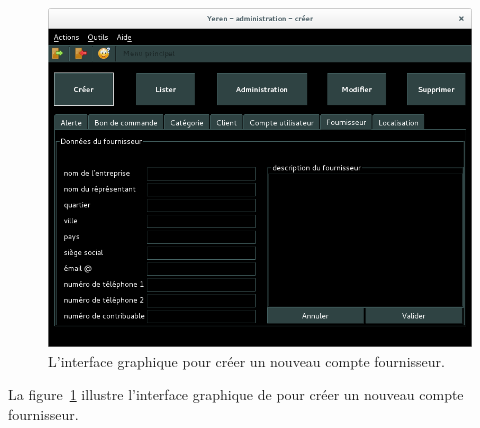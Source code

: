 
\newpage
{}

\begin{figure}[!htpb]
	\centering
	\includegraphics[scale=0.45]{images/compte-fournisseur-creer.png}
	\caption{L'interface graphique pour cr\'eer un
			nouveau compte fournisseur.}
	\label{fig:admin-comptes-fournisseurs-creer}
\end{figure}

La figure~\ref{fig:admin-comptes-fournisseurs-creer} illustre
l'interface graphique de \yeroth pour cr\'eer un nouveau
compte fournisseur.

